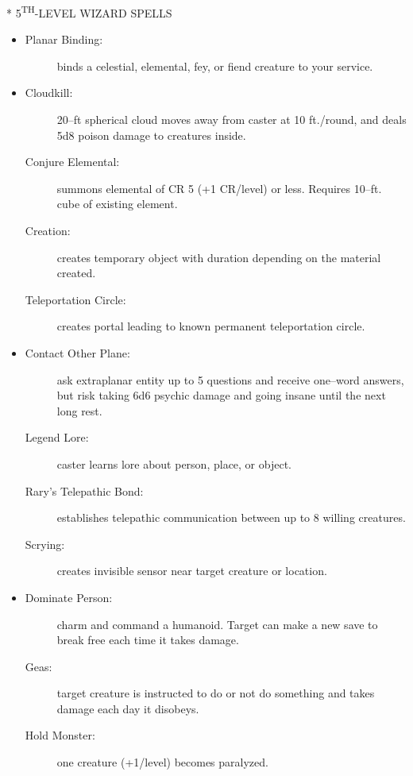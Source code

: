 \documentclass[DIV=14, paper=a4, fontsize=12pt, twocolumn, twoside]{scrartcl}
\makeatletter
\let\origsection\section
\renewcommand\section{\@ifstar{\starsection}{\nostarsection}}
\newcommand\nostarsection[1]
{\origsection{#1}\vspace{-0.5em}}
\newcommand\starsection[1]
{\vspace{-0.5cm}\origsection*{#1}\vspace{-0.3cm}}
\newcommand\invisiblesection[1]{%
  \refstepcounter{section}%
  \sectionmark{#1}
}
\newcommand\listsection[2]{%
	\invisiblesection{#2}
	\section*{\color{dndblue} #1}
}
\renewcommand\thesection{}
\makeatother
\begin{document}
\listsection{\color{dndblue}5\textsuperscript{TH}-LEVEL WIZARD SPELLS}{LEVEL 5}

\begin{itemize}[align=parleft,labelwidth=1cm]
	\renewcommand{\labelitemi}{Abjur}\item
	\begin{description}
 \item[Planar Binding:] binds a celestial, elemental, fey, or fiend creature to your service.
\end{description}
\renewcommand{\labelitemi}{Conj}\item
\begin{description}
 \item[Cloudkill:] 20–ft spherical cloud moves away from caster at 10 ft./round, and deals 5d8 poison damage to creatures inside.
 \item[Conjure Elemental:] summons elemental of CR 5 (+1 CR/level) or less. Requires 10–ft. cube of existing element.
 \item[Creation:] creates temporary object with duration depending on the material created.
 \item[Teleportation Circle:] creates portal leading to known permanent teleportation circle.
\end{description}
\renewcommand{\labelitemi}{Div}\item
\begin{description}
 \item[Contact Other Plane:] ask extraplanar entity up to 5 questions and receive one–word answers, but risk taking 6d6 psychic damage and going insane until the next long rest.
 \item[Legend Lore:] caster learns lore about person, place, or object.
 \item[Rary’s Telepathic Bond:] establishes telepathic communication between up to 8 willing creatures.
 \item[Scrying:] creates invisible sensor near target creature or location.
\end{description}
\renewcommand{\labelitemi}{Ench}\item
\begin{description}
 \item[Dominate Person:] charm and command a humanoid. Target can make a new save to break free each time it takes damage.
 \item[Geas:] target creature is instructed to do or not do something and takes damage each day it disobeys.
 \item[Hold Monster:] one creature (+1/level) becomes paralyzed.

\end{description}
\end{itemize}
\end{document}
